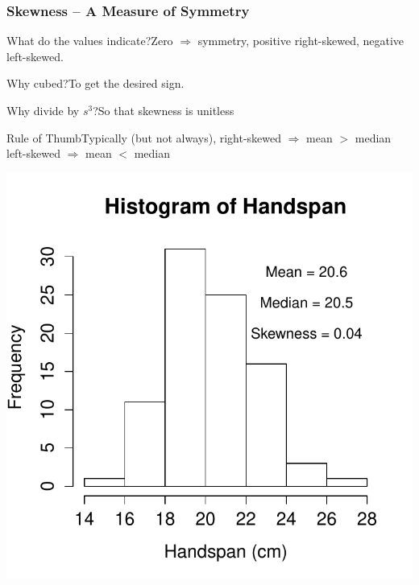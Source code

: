 \documentclass[handout]{beamer}
\begin{document}
\begin{frame}

\frametitle{Skewness -- A Measure of Symmetry}

\begin{center}
\end{center}
\pause
\begin{block}{What do the values indicate?}Zero $\Rightarrow$ symmetry, positive right-skewed, negative left-skewed.\end{block} \pause
\begin{block}{Why cubed?}To get the desired sign.\end{block} \pause
\begin{block}{Why divide by $s^3$?}So that skewness is unitless\end{block}\pause
\begin{block}{Rule of Thumb}Typically (but not always), right-skewed $\Rightarrow$ mean $>$ median\\ left-skewed $\Rightarrow$ mean $<$ median\end{block}

\end{frame}




\begin{frame}
\centering \includegraphics[scale = 0.75]{./images/handspan_skew}


\end{frame}
\end{document}
